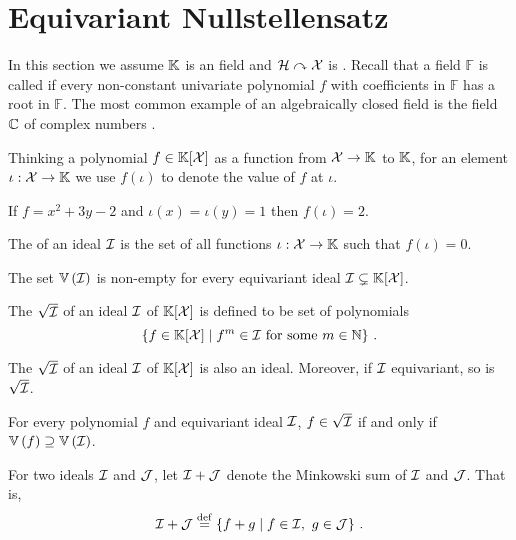 %
\section{Equivariant Nullstellensatz}
%
In this section we assume $\mathbb{K}$ is an  field and $\mathcal{H}\curvearrowright\mathcal{X}$ is .
Recall that a field $\mathbb{F}$ is called  if every non-constant univariate polynomial $f$ with coefficients in $\mathbb{F}$ has a root in $\mathbb{F}$.
The most common example of an algebraically closed field is the field $\mathbb{C}$ of complex numbers
\cite[Section 1.1, Theorem 7]{CLO15}.

Thinking a polynomial $f\in\mathbb{K}[\mathcal{X}]$ as a function from $\mathcal{X} \to \mathbb{K}$ to $\mathbb{K}$,
for an element $\iota : \mathcal{X} \to \mathbb{K}$ we use $f(\iota)$ to denote the value of $f$ at $\iota$.
%
\begin{example}\label{ex:inst}
    If $f = x^2 + 3y - 2$ and $\iota(x) = \iota(y) = 1$ then $f(\iota) = 2$.
\end{example}
%
\begin{definition}\label{def:variety}
    The  of an ideal $\idl[I]$ is the set of all functions $\iota : \mathcal{X} \to \mathbb{K}$ such that $f(\iota) = 0$.
\end{definition}
%
\begin{theorem}\label{thm:weak null}
    The set $\zeros{\idl}$ is non-empty for every equivariant ideal $\idl \subsetneq \poly{\K}{\X}$.
\end{theorem}
%
\begin{definition}\label{def:rad}
    The  $\rad{\idl[I]}$ of an ideal $\idl[I]$ of $\mathbb{K}[\mathcal{X}]$ is defined to be set of polynomials
    \[
    \setof{f\in\poly{\K}{\Indets}}{f^m\in\idl[I] \text{ for some $m\in\N$}} \ .
    \]
\end{definition}
%
\begin{lemma}
    The  $\rad{\idl[I]}$ of an ideal $\idl[I]$ of $\mathbb{K}[\mathcal{X}]$ is also an ideal.
    Moreover, if $\idl[I]$ equivariant,
    so is $\rad{\idl[I]}$.
\end{lemma}
%
\begin{theorem}\label{thm:strong null}
    For every polynomial $f$ and equivariant ideal $\idl[I]$,
    $f\in\rad{\idl[I]}$ if and only if $\zeros{f} \supseteq \zeros{\idl[I]}$.
\end{theorem}
%
\begin{definition}
    For two ideals $\idl[I]$ and $\idl[J]$,
    let $\idl[I] + \idl[J]$ denote the Minkowski sum of $\idl[I]$ and $\idl[J]$.
    That is,
    \[
    \idl[I] + \idl[J] \defeq
    \setof{f + g}{f\in\idl[I],\ g\in\idl[J]} \ .
    \]
\end{definition}
